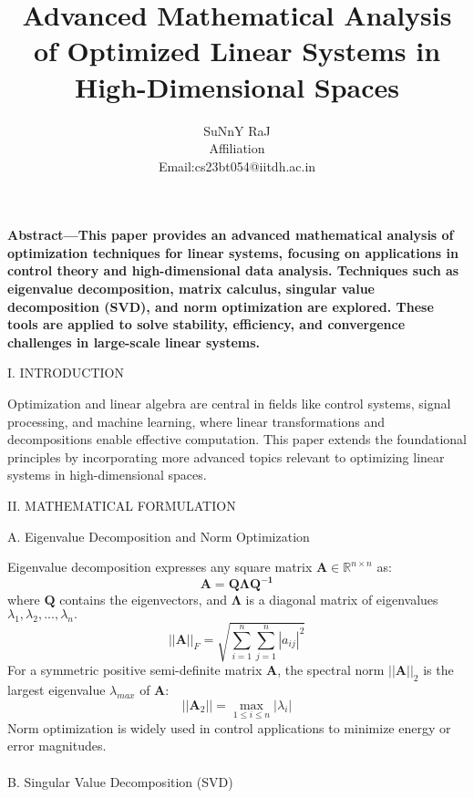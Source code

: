\documentclass{article}
\title{\textbf{Advanced Mathematical Analysis of Optimized
	Linear Systems in High-Dimensional Spaces}}
\author{SuNnY RaJ \\ Affiliation \\ Email:cs23bt054@iitdh.ac.in}
\date{}
\begin{document}
	
	\maketitle  %
	
	\begin{multicols}{2}
		\textbf{Abstract—This paper provides an advanced mathematical
			analysis of optimization techniques for linear systems, focusing on
			applications in control theory and high-dimensional data analysis.
			Techniques such as eigenvalue decomposition, matrix calculus,
			singular value decomposition (SVD), and norm optimization are
			explored. These tools are applied to solve stability, efficiency, and
			convergence challenges in large-scale linear systems.}
			\begin{center}
				I. INTRODUCTION
			\end{center}
			
			
			Optimization and linear algebra are central in fields like control systems, signal processing, and machine learning, where
			linear transformations and decompositions enable effective
			computation. This paper extends the foundational principles
			by incorporating more advanced topics relevant to optimizing
			linear systems in high-dimensional spaces.
			\begin{center}
				II. MATHEMATICAL FORMULATION 
			\end{center}
			A. Eigenvalue Decomposition and Norm Optimization
			
			Eigenvalue decomposition expresses any square matrix \(\mathbf{A} \in \mathbb{R}^{n\times n} \) as:
			\begin{equation}
					\mathbf{A=Q\Lambda Q^{-1}}
			\end{equation}
			where $\mathbf{Q}$ contains the eigenvectors, and $\mathbf{\Lambda}$ is a diagonal matrix
			of eigenvalues \(\lambda_{1},\lambda_{2}, . . . , \lambda_{n}. \)
			\begin{equation}
				||\mathbf{A}||_{F}=\sqrt{\sum_{i=1}^n \sum_{j=1}^n |a_{ij}|^2}
			\end{equation}
			For a symmetric positive semi-definite matrix $\mathbf{A}$, the spectral
			norm $||\mathbf{A}||_{2}$ is the largest eigenvalue $\lambda_{max}$ of $\mathbf{A}$:
			\begin{equation}
				||\mathbf{A}_{2}||=\max_{1\leq i \leq n}|\lambda_{i}|
			\end{equation}
			Norm optimization is widely used in control applications to
			minimize energy or error magnitudes.\\ \\
			B. Singular Value Decomposition (SVD)
			

\end{multicols}
\end{document}
